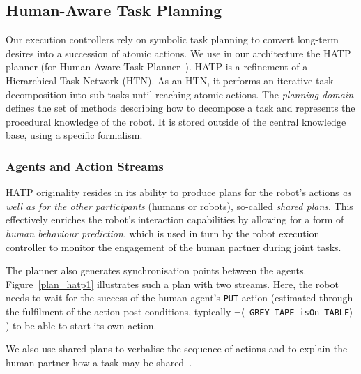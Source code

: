 \documentclass[preprint,3p,times]{elsarticle}
\newcommand{\stmt}[1]{{\footnotesize \tt $\langle$ #1\relax$\rangle$}}
\begin{document}

\subsection{Human-Aware Task Planning}
\label{hatp}

Our execution controllers rely on symbolic task planning to convert long-term
desires into a succession of atomic actions. We use in our architecture the
HATP planner (for Human Aware Task Planner~\cite{Alili2008, Alili2009}).  HATP
is a refinement of a Hierarchical Task Network (HTN). As an HTN, it performs an
iterative task decomposition into sub-tasks until reaching atomic actions. The
\emph{planning domain} defines the set of methods describing how to decompose a
task and represents the procedural knowledge of the robot. It is stored outside
of the central knowledge base, using a specific formalism.

\subsubsection{Agents and Action Streams}

HATP originality resides in its ability to produce plans for the robot's actions
\emph{as well as for the other participants} (humans or robots), so-called
\emph{shared plans}. This effectively enriches the robot's interaction
capabilities by allowing for a form of \emph{human behaviour prediction}, which
is used in turn by the robot execution controller to monitor the engagement of
the human partner during joint tasks.

The planner also generates synchronisation points between the agents.
Figure~\ref{plan_hatp1} illustrates such a plan with two streams.  Here, the
robot needs to wait for the success of the human agent's {\tt PUT} action
(estimated through the fulfilment of the action post-conditions, typically
$\neg$\stmt{GREY\_TAPE isOn TABLE}) to be able to start its own action.

We also use shared plans to verbalise the sequence of actions and to explain
the human partner how a task may be shared~\cite{warnier2012when}.
\end{document}
